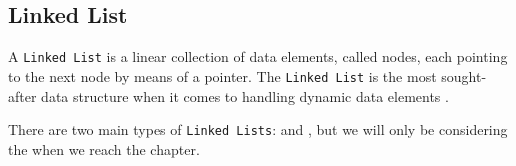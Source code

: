 

% 
% 
\subsection{Linked List}
\label{sec:linked-list}
A \lstinline{Linked List} is a linear collection of data elements, called nodes, each pointing to the next node by means of a pointer. The \lstinline{Linked List} is the most sought-after data structure when it comes to handling dynamic data elements \cite{ravikiran_linked_list}.
\smallskip

There are two main types of \lstinline{Linked Lists}:  and , but we will only be considering the  when we reach the  chapter.
